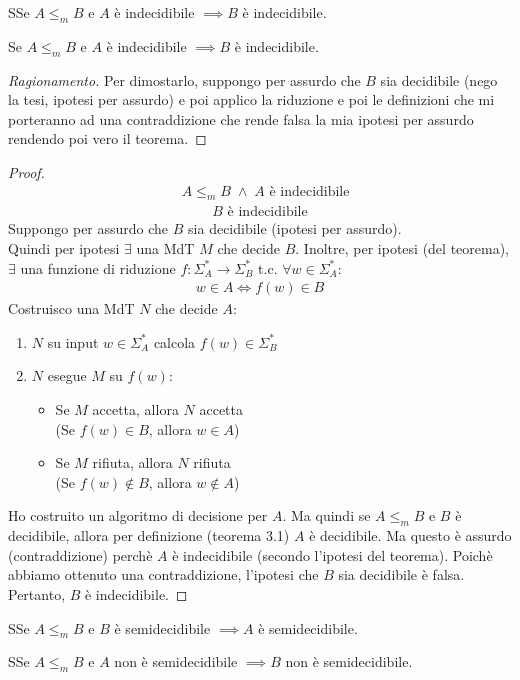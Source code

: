 \documentclass{article}  %
\theoremstyle{definition}
\newenvironment{ragionamento}[1][]
  {\begin{proof}[Ragionamento#1]\renewcommand{\qedsymbol}{}\normalfont}
  {\end{proof}}
\begin{document}
\begin{theorem}{3.2}
	SSe $A \leq_m B$ e $A$ è indecidibile $\implies B$ è indecidibile.
\end{theorem}
\begin{esercizio}[Dimostrazione 3.2]
	\footnotesize %
	Se $A \leq_m B$ e $A$ è indecidibile $\implies B$ è indecidibile.
	\begin{ragionamento}
		Per dimostarlo, suppongo per assurdo che $B$ sia decidibile (nego la tesi, ipotesi per assurdo) e poi applico
		la riduzione e poi le definizioni che mi porteranno ad una contraddizione che rende falsa la mia ipotesi per assurdo
		rendendo poi vero il teorema.
	\end{ragionamento}
	\begin{proof}
		\begin{align*}
			 & A \leq_m B \;\wedge\; A \text{ è indecidibile} \tag*{(ipotesi)}
		\end{align*}
		\begin{align*}
			B \text{ è indecidibile} \tag*{(tesi)}
		\end{align*}
		Suppongo per assurdo che $B$ sia decidibile (ipotesi per assurdo). \\
		Quindi per ipotesi $\exists$ una MdT $M$ che decide $B$. Inoltre, per ipotesi (del teorema), $\exists$ una funzione
		di riduzione $f: \Sigma^*_A \rightarrow \Sigma^*_B$ t.c. $\forall{w} \in \Sigma^*_A$:
		\begin{align*}
			w \in A \iff f(w) \in B
		\end{align*}
		Costruisco una MdT $N$ che decide $A$:
		\begin{enumerate}
			\item $N$ su input $w \in \Sigma^*_A$ calcola $f(w) \in \Sigma^*_B$
			\item $N$ esegue $M$ su $f(w)$:
			      \begin{itemize}
				      \item Se $M$ accetta, allora $N$ accetta \\
				            (Se $f(w) \in B$, allora $w \in A$)
				      \item Se $M$ rifiuta, allora $N$ rifiuta \\
				            (Se $f(w) \notin B$, allora $w \notin A$)
			      \end{itemize}
		\end{enumerate}
		Ho costruito un algoritmo di decisione per $A$. Ma quindi se $A \leq_m B$ e $B$ è decidibile, allora per definizione
		(teorema 3.1) $A$ è decidibile. Ma questo è assurdo (contraddizione) perchè $A$ è indecidibile (secondo l'ipotesi del teorema).
		Poichè abbiamo ottenuto una contraddizione, l'ipotesi che $B$ sia decidibile è falsa. Pertanto, $B$ è indecidibile.
	\end{proof}
\end{esercizio}
\begin{theorem}{3.3}
	SSe $A \leq_m B$ e $B$ è semidecidibile $\implies A$ è semidecidibile.
\end{theorem}
\begin{theorem}{3.4}
	SSe $A \leq_m B$ e $A$ non è semidecidibile $\implies B$ non è semidecidibile.
\end{theorem}
\end{document}

